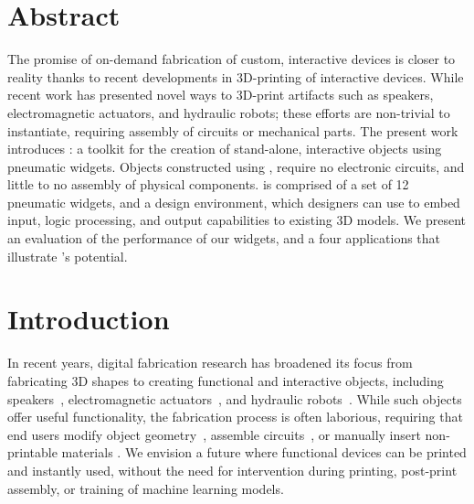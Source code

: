   \section{Abstract}
    The promise of on-demand fabrication of custom, interactive devices is
    closer to reality thanks to recent developments in 3D-printing of
    interactive devices. While recent work has presented novel ways to
    3D-print artifacts such as speakers, electromagnetic actuators, and
    hydraulic robots; these efforts are non-trivial to instantiate,
    requiring assembly of circuits or mechanical parts. The present work
    introduces \al: a toolkit for the creation of stand-alone, interactive
    objects using pneumatic widgets. Objects constructed using \al, require
    no electronic circuits, and little to no assembly of physical
    components. \al is comprised of a set of 12 pneumatic widgets, and a
    design environment, which designers can use to embed input, logic
    processing, and output capabilities to existing 3D models. We present
    an evaluation of the performance of our widgets, and a four
    applications that illustrate \al's potential.

  \section{Introduction}
    In recent years, digital fabrication research has broadened its
    focus from fabricating 3D shapes to creating
    functional and interactive objects, including
    speakers~\cite{Ishiguro:2014}, 
    electromagnetic actuators~\cite{Peng:2016}, and hydraulic
    robots~\cite{MacCurdy:2016}. While such objects offer useful
    functionality, the fabrication process is often laborious,
    requiring that end users modify object
    geometry~\cite{Ledo:2017}, assemble
    circuits~\cite{Murray-Smith:2008}, or 
    manually insert non-printable materials \cite{He:2017}. We
    envision a future where functional devices can be printed and
    instantly used, without the need for intervention during
    printing, post-print assembly, or training of machine learning
    models.

